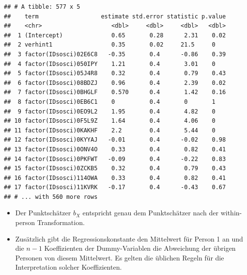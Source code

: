 \documentclass[
]{book}
\newenvironment{Shaded}{\begin{snugshade}}{\end{snugshade}}
\newcommand{\DataTypeTok}[1]{\textcolor[rgb]{0.13,0.29,0.53}{#1}}
\newcommand{\DecValTok}[1]{\textcolor[rgb]{0.00,0.00,0.81}{#1}}
\newcommand{\KeywordTok}[1]{\textcolor[rgb]{0.13,0.29,0.53}{\textbf{#1}}}
\newcommand{\NormalTok}[1]{#1}
\newcommand{\OperatorTok}[1]{\textcolor[rgb]{0.81,0.36,0.00}{\textbf{#1}}}
\newcommand{\StringTok}[1]{\textcolor[rgb]{0.31,0.60,0.02}{#1}}
\providecommand{\tightlist}{%
  \setlength{\itemsep}{0pt}\setlength{\parskip}{0pt}}
\begin{document}
\begin{Shaded}
\end{Shaded}

\begin{verbatim}
## # A tibble: 577 x 5
##    term                  estimate std.error statistic p.value
##    <chr>                    <dbl>     <dbl>     <dbl>   <dbl>
##  1 (Intercept)              0.65       0.28      2.31    0.02
##  2 verhint1                 0.35       0.02     21.5     0   
##  3 factor(IDsosci)02E6C8   -0.35       0.4      -0.86    0.39
##  4 factor(IDsosci)050IPY    1.21       0.4       3.01    0   
##  5 factor(IDsosci)05J4R8    0.32       0.4       0.79    0.43
##  6 factor(IDsosci)08BDZJ    0.96       0.4       2.39    0.02
##  7 factor(IDsosci)0BHGLF    0.570      0.4       1.42    0.16
##  8 factor(IDsosci)0EB6C1    0          0.4       0       1   
##  9 factor(IDsosci)0EO9L2    1.95       0.4       4.82    0   
## 10 factor(IDsosci)0F5L9Z    1.64       0.4       4.06    0   
## 11 factor(IDsosci)0KAKHF    2.2        0.4       5.44    0   
## 12 factor(IDsosci)0KYYAJ   -0.01       0.4      -0.02    0.98
## 13 factor(IDsosci)0ONV4O    0.33       0.4       0.82    0.41
## 14 factor(IDsosci)0PKFWT   -0.09       0.4      -0.22    0.83
## 15 factor(IDsosci)0ZCKB5    0.32       0.4       0.79    0.43
## 16 factor(IDsosci)114OWA    0.33       0.4       0.82    0.41
## 17 factor(IDsosci)11KVRK   -0.17       0.4      -0.43    0.67
## # ... with 560 more rows
\end{verbatim}

\begin{itemize}
\tightlist
\item
  Der Punktschätzer \(b_{X}\) entspricht genau dem Punktschätzer nach der within-person Transformation.
\item
  Zusätzlich gibt die Regressionskonstante den Mittelwert für Person 1 an und die \(n - 1\) Koeffizienten der Dummy-Variablen die Abweichung der übrigen Personen von diesem Mittelwert. Es gelten die üblichen Regeln für die Interpretation solcher Koeffizienten.
\end{itemize}
\end{document}
